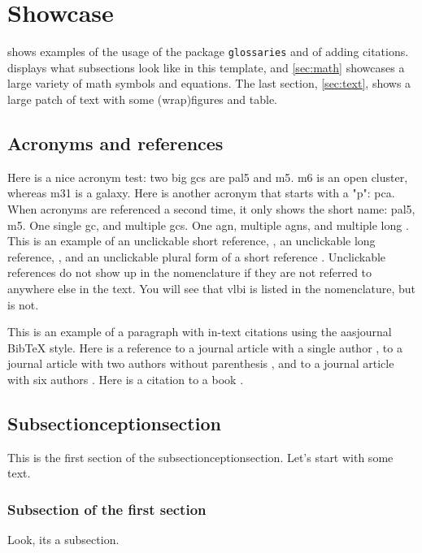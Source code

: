 
\chapter{Showcase}
\label{chap:showcase}
 shows examples of the usage of the package \texttt{glossaries} and of adding citations.  displays what subsections look like in this template, and \cref{sec:math} showcases a large variety of math symbols and equations. The last section, \cref{sec:text}, shows a large patch of text with some (wrap)figures and table.

\section{Acronyms and references}
\label{sec:acr_refs}
Here is a nice acronym test: two big \glspl{gc} are \gls{pal5} and \gls{m5}. \Gls{m6} is an open cluster, whereas \gls{m31} is a galaxy. Here is another acronym that starts with a "p": \gls{pca}. When acronyms are referenced a second time, it only shows the short name: \gls{pal5}, \gls{m5}. One single \gls{gc}, and multiple \glspl{gc}. One \gls{agn}, multiple \glspl{agn}, and multiple long . This is an example of an unclickable short reference, , an unclickable long reference, , and an unclickable plural form of a short reference . Unclickable references do not show up in the nomenclature if they are not referred to anywhere else in the text. You will see that \gls{vlbi} is listed in the nomenclature, but  is not. 

This is an example of a paragraph with in-text
citations using the aasjournal BibTeX style.
Here is a reference to a journal article with
a single author \citep{article}, to a journal
article with two authors without parenthesis \citet{article2}, and to a journal article with six authors \citep{article6}. Here is a citation to a book \citep{book}.

\section{Subsectionceptionsection}
\label{sec:subsection}
This is the first section of the subsectionceptionsection. Let's start with some text. \lipsum[66]
\subsection{Subsection of the first section}
Look, its a subsection.
